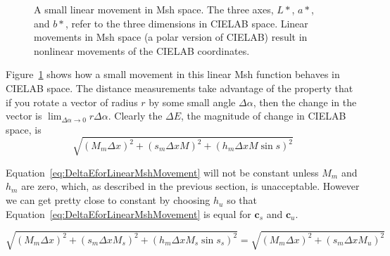 \documentclass{llncs}
\newcommand{\Lab}{CIELAB\xspace}
\newcommand{\Msh}{Msh\xspace}
\newcommand{\DeltaE}{\ensuremath{\Delta{}E}\xspace}
\newcommand*{\cvec}[1]{\mathbf{#1}}
\begin{document}
\begin{figure}
  \centering
  \caption{A small linear movement in \Msh space.  The three axes, $L*$,
    $a*$, and $b*$, refer to the three dimensions in \Lab space.  Linear
    movements in \Msh space (a polar version of \Lab) result in nonlinear
    movements of the \Lab coordinates.}
  \label{sec:LinearMshMovement}
\end{figure}

Figure~\ref{sec:LinearMshMovement} shows how a small movement in this
linear \Msh function behaves in \Lab space.  The distance measurements take
advantage of the property that if you rotate a vector of radius $r$ by some
small angle $\Delta\alpha$, then the change in the vector is
$\lim_{\Delta\alpha \rightarrow 0}r \Delta\alpha$.  Clearly the \DeltaE,
the magnitude of change in \Lab space, is
\begin{equation}
  \sqrt{(M_m \Delta x)^2 + (s_m \Delta x M)^2 + (h_m \Delta x M \sin s)^2}
  \label{eq:DeltaEforLinearMshMovement}
\end{equation}

Equation~\ref{eq:DeltaEforLinearMshMovement} will not be constant unless
$M_m$ and $h_m$ are zero, which, as described in the previous section, is
unacceptable.  However we can get pretty close to constant by choosing
$h_u$ so that Equation~\ref{eq:DeltaEforLinearMshMovement} is equal for
$\cvec{c}_s$ and $\cvec{c}_u$.

\begin{equation}
  \sqrt{(M_m \Delta x)^2 + (s_m \Delta x M_s)^2 + (h_m \Delta x M_s \sin s_s)^2}
  =
  \sqrt{(M_m \Delta x)^2 + (s_m \Delta x M_u)^2}
  \label{eqn:hm_criterion}
\end{equation}
\end{document}

